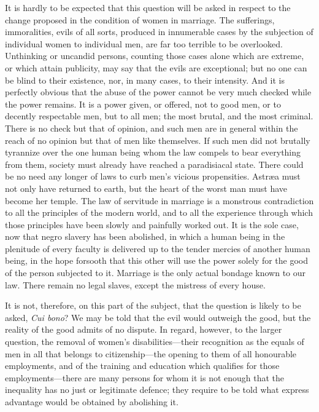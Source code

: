 \documentclass[12pt]{report}
\begin{document}
It is hardly to be expected that this question will be asked in respect to the change proposed in the condition of women in marriage. The sufferings, immoralities, evils of all sorts, produced in innumerable cases by the subjection of individual women to individual men, are far too terrible to be overlooked. Unthinking or uncandid persons, counting those cases alone which are extreme, or which attain publicity, may say that the evils are exceptional; but no one can be blind to their existence, nor, in many cases, to their intensity. And it is perfectly obvious that the abuse of the power cannot be very much checked while the power remains. It is a power given, or offered, not to good men, or to decently respectable men, but to all men; the most brutal, and the most criminal. There is no check but that of opinion, and such men are in general within the reach of no opinion but that of men like themselves. If such men did not brutally tyrannize over the one human being whom the law compels to bear everything from them, society must already have reached a paradisiacal state. There could be no need any longer of laws to curb men's vicious propensities. Astræa must not only have returned to earth, but the heart of the worst man must have become her temple. The law of servitude in marriage is a monstrous contradiction to all the principles of the modern world, and to all the experience through which those principles have been slowly and painfully worked out. It is the sole case, now that negro slavery has been abolished, in which a human being in the plenitude of every faculty is delivered up to the tender mercies of another human being, in the hope forsooth that this other will use the power solely for the good of the person subjected to it. Marriage is the only actual bondage known to our law. There remain no legal slaves, except the mistress of every house.

It is not, therefore, on this part of the subject, that the question is likely to be asked, \emph{Cui bono}? We may be told that the evil would outweigh the good, but the reality of the good admits of no dispute. In regard, however, to the larger question, the removal of women's disabilities—their recognition as the equals of men in all that belongs to citizenship—the opening to them of all honourable employments, and of the training and education which qualifies for those employments—there are many persons for whom it is not enough that the inequality has no just or legitimate defence; they require to be told what express advantage would be obtained by abolishing it.
\end{document}
